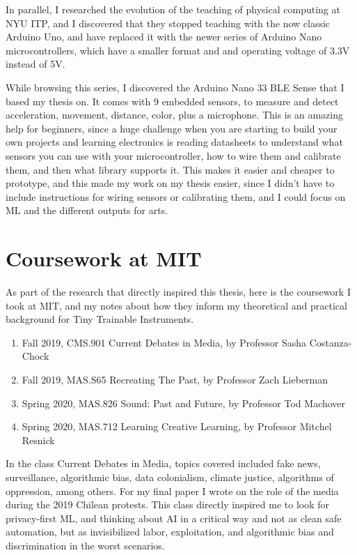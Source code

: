 In parallel, I researched the evolution of the teaching of physical computing at \acrshort{NYU} \acrshort{ITP}, and I discovered that they stopped teaching with the now classic Arduino Uno, and have replaced it with the newer series of Arduino Nano microcontrollers, which have a smaller format and and operating voltage of 3.3V instead of 5V.

While browsing this series, I discovered the Arduino Nano 33 \acrshort{BLE} Sense that I based my thesis on. It comes with 9 embedded sensors, to measure and detect acceleration, movement, distance, color, plus a microphone. This is an amazing help for beginners, since a huge challenge when you are starting to build your own projects and learning electronics is reading datasheets to understand what sensors you can use with your microcontroller, how to wire them and calibrate them, and then what library supports it. This makes it easier and cheaper to prototype, and this made my work on my thesis easier, since I didn't have to include instructions for wiring sensors or calibrating them, and I could focus on \acrshort{ML} and the different outputs for arts.

\section{Coursework at MIT}

As part of the research that directly inspired this thesis, here is the coursework I took at MIT, and my notes about how they inform my theoretical and practical background for Tiny Trainable Instruments.

\begin{enumerate}
  \item Fall 2019, CMS.901 Current Debates in Media, by Professor Sasha Costanza-Chock
  \item Fall 2019, MAS.S65 Recreating The Past, by Professor Zach Lieberman
  \item Spring 2020, MAS.826 Sound: Past and Future, by Professor Tod Machover
  \item Spring 2020, MAS.712 Learning Creative Learning, by Professor Mitchel Resnick
\end{enumerate}

In the class Current Debates in Media, topics covered included fake news, surveillance, algorithmic bias, data colonialism, climate justice, algorithms of oppression, among others. For my final paper I wrote on the role of the media during the 2019 Chilean protests. This class directly inspired me to look for privacy-first \acrshort{ML}, and thinking about \acrshort{AI} in a critical way and not as clean safe automation, but as invisibilized labor, exploitation, and algorithmic bias and discrimination in the worst scenarios.


